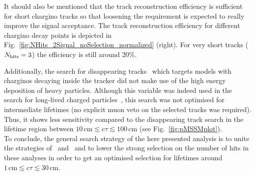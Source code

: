 It should also be mentioned that the track reconstruction efficiency is sufficient for short chargino tracks so that loosening the \nhits requirement is expected to really improve the signal acceptance. 
The track reconstruction efficiency for different chargino decay points is depicted in Fig.~\ref{fig:NHits_2Signal_noSelection_normalized} (right).
For very short tracks ($N_{\text{hits}}=3$) the efficiency is still around 20\%.



Additionally, the search for disappearing tracks~\cite{bib:CMS:DT_8TeV} which targets models with charginos decaying inside the tracker did not make use of the high energy deposition of heavy particles. 
Although this variable was indeed used in the search for long-lived charged particles~\cite{bib:CMS:HSCP_8TeV}, this search was not optimised for intermediate lifetimes (\eg no explicit muon veto on the selected tracks was required). 
Thus, it shows less sensitivity compared to the disappearing track search in the lifetime region between $10\,\text{cm} \lesssim c\tau \lesssim 100\,\text{cm}$ (see Fig.~\ref{fig:pMSSMplot}).\\

To conclude, the general search strategy of the here presented analysis is to unite the strategies of~\cite{bib:CMS:HSCP_8TeV} and~\cite{bib:CMS:DT_8TeV} and to lower the strong selection on the number of hits in these analyses in order to get an optimised selection for lifetimes around $1\,\text{cm} \lesssim c\tau \lesssim  30\,\text{cm}$.

